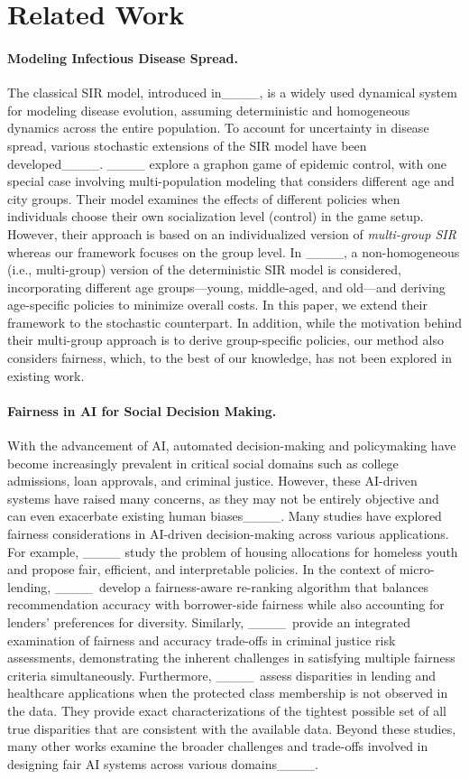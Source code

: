 \section{Related Work}
\paragraph{Modeling Infectious Disease Spread.} 
The classical SIR model, introduced in____, is a widely used dynamical system for modeling disease evolution, assuming deterministic and homogeneous dynamics across the entire population. To account for uncertainty in disease spread, various stochastic extensions of the SIR model have been developed____. ____ explore a graphon game of epidemic control, with one special case involving multi-population modeling that considers different age and city groups. Their model examines the effects of different policies when individuals choose their own socialization level (control) in the game setup. However, their approach is based on an individualized version of \textit{multi-group SIR} whereas our framework focuses on the group level. In ____, a non-homogeneous (i.e., multi-group) version of the deterministic SIR model is considered, incorporating different age groups---young, middle-aged, and old---and deriving age-specific policies to minimize overall costs. In this paper, we extend their framework to the stochastic counterpart. In addition, while the motivation behind their multi-group approach is to derive group-specific policies, our method also considers fairness, which, to the best of our knowledge, has not been explored in existing work.
 
\paragraph{Fairness in AI for Social Decision Making.} With the advancement of AI, automated decision-making and policymaking have become increasingly prevalent in critical social domains such as college admissions, loan approvals, and criminal justice. However, these AI-driven systems have raised many concerns, as they may not be entirely objective and can even exacerbate existing human biases____. 
Many studies have explored fairness considerations in AI-driven decision-making across various applications. For example, ____ study the problem of housing allocations for homeless youth and propose fair, efficient, and interpretable policies. In the context of micro-lending, ____~develop a fairness-aware re-ranking algorithm that balances recommendation accuracy with borrower-side fairness while also accounting for lenders’ preferences for diversity. Similarly, ____~provide an integrated examination of fairness and accuracy trade-offs in criminal justice risk assessments, demonstrating the inherent challenges in satisfying multiple fairness criteria simultaneously. Furthermore, ____~assess disparities in lending and healthcare applications when the protected class membership is not observed in the data. They provide exact characterizations of the tightest possible set of all true disparities that are consistent with the available data. Beyond these studies, many other works examine the broader challenges and trade-offs involved in designing fair AI systems across various domains____. 

